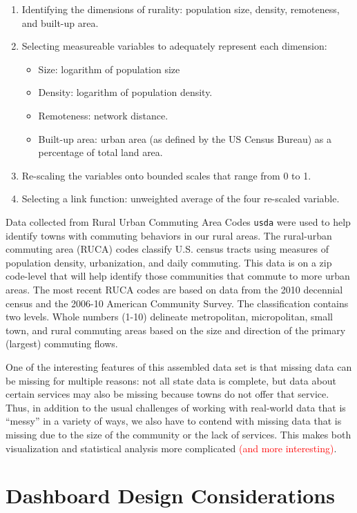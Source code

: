 \documentclass[letterpaper,inpress]{jdsart}
\begin{document}
\begin{enumerate}
\item Identifying the dimensions of rurality: population size, density, remoteness, and built-up area.
\item Selecting measureable variables to adequately represent each dimension:
    \begin{itemize}
        \item Size: logarithm of population size
        \item Density: logarithm of population density.
        \item Remoteness: network distance.
        \item Built-up area: urban area (as defined by the US Census Bureau) as a percentage of total land area.
    \end{itemize}
\item Re-scaling the variables onto bounded scales that range from 0 to 1.
\item Selecting a link function: unweighted average of the four re-scaled variable.
\end{enumerate}

Data collected from Rural Urban Commuting Area Codes \texttt{usda} were used to help identify towns with commuting behaviors in our rural areas. The rural-urban commuting area (RUCA) codes classify U.S. census tracts using measures of population density, urbanization, and daily commuting. This data is on a zip code-level that will help identify those communities that commute to more urban areas. The most recent RUCA codes are based on data from the 2010 decennial census and the 2006-10 American Community Survey. The classification contains two levels. Whole numbers (1-10) delineate metropolitan, micropolitan, small town, and rural commuting areas based on the size and direction of the primary (largest) commuting flows.

One of the interesting features of this assembled data set is that missing data can be missing for multiple reasons: not all state data is complete, but data about certain services may also be missing because towns do not offer that service.
Thus, in addition to the usual challenges of working with real-world data that is ``messy'' in a variety of ways, we also have to contend with missing data that is missing due to the size of the community or the lack of services. This makes both visualization and statistical analysis more complicated {\textcolor{red}{(and more interesting)}}.

\hypertarget{dashboard-design-considerations}{%
\section{Dashboard Design Considerations}\label{dashboard-design-considerations}}
\end{document}
